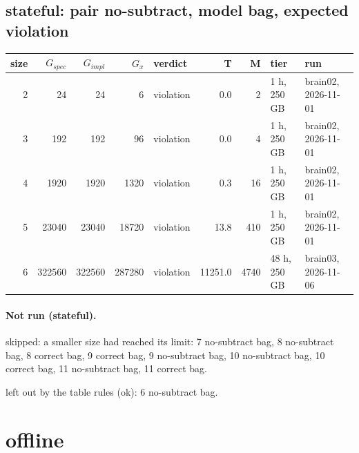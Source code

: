 \documentclass[10pt]{article}
\begin{document}
\subsection*{stateful: pair \textsf{no-subtract}, model bag, expected violation}
\begin{longtable}{@{}rrrrlrrll@{}}
\toprule
size & $G_{\mathit{spec}}$ & $G_{\mathit{impl}}$ & $G_x$ & verdict & T & M & tier & run \\
\midrule
\endhead
\color{red} 2 & 24 & 24 & 6 & violation & 0.0 & 2 & 1 h, 250 GB & brain02, 2026-11-01 \\
\color{red} 3 & 192 & 192 & 96 & violation & 0.0 & 4 & 1 h, 250 GB & brain02, 2026-11-01 \\
\color{red} 4 & 1920 & 1920 & 1320 & violation & 0.3 & 16 & 1 h, 250 GB & brain02, 2026-11-01 \\
\color{red} 5 & 23040 & 23040 & 18720 & violation & 13.8 & 410 & 1 h, 250 GB & brain02, 2026-11-01 \\
\color{blue} 6 & 322560 & 322560 & 287280 & violation & 11251.0 & 4740 & 48 h, 250 GB & brain03, 2026-11-06 \\
\bottomrule
\end{longtable}
\paragraph{Not run (stateful).}
skipped: a smaller size had reached its limit: 7 no-subtract bag, 8 no-subtract bag, 8 correct bag, 9 correct bag, 9 no-subtract bag, 10 no-subtract bag, 10 correct bag, 11 no-subtract bag, 11 correct bag.\par
left out by the table rules (ok): 6 no-subtract bag.\par
\section*{offline}
\end{document}
